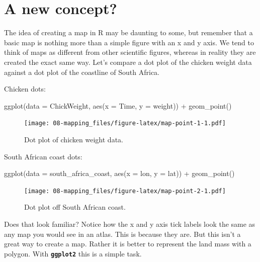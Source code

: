 \documentclass[
]{book}
\newenvironment{Shaded}{\begin{snugshade}}{\end{snugshade}}
\newcommand{\AttributeTok}[1]{\textcolor[rgb]{0.77,0.63,0.00}{#1}}
\newcommand{\FunctionTok}[1]{\textcolor[rgb]{0.00,0.00,0.00}{#1}}
\newcommand{\NormalTok}[1]{#1}
\newcommand{\SpecialCharTok}[1]{\textcolor[rgb]{0.00,0.00,0.00}{#1}}
\begin{document}
\hypertarget{a-new-concept}{%
\section{A new concept?}\label{a-new-concept}}

The idea of creating a map in R may be daunting to some, but remember that a basic map is nothing more than a simple figure with an x and y axis. We tend to think of maps as different from other scientific figures, whereas in reality they are created the exact same way. Let's compare a dot plot of the chicken weight data against a dot plot of the coastline of South Africa.

Chicken dots:

\begin{Shaded}
\begin{Highlighting}[]
\FunctionTok{ggplot}\NormalTok{(}\AttributeTok{data =}\NormalTok{ ChickWeight, }\FunctionTok{aes}\NormalTok{(}\AttributeTok{x =}\NormalTok{ Time, }\AttributeTok{y =}\NormalTok{ weight)) }\SpecialCharTok{+}
  \FunctionTok{geom\_point}\NormalTok{()}
\end{Highlighting}
\end{Shaded}

\begin{figure}
\centering
\texttt{[image: 08-mapping\_files/figure-latex/map-point-1-1.pdf]}
\caption{\label{fig:map-point-1}Dot plot of chicken weight data.}
\end{figure}

South African coast dots:

\begin{Shaded}
\begin{Highlighting}[]
\FunctionTok{ggplot}\NormalTok{(}\AttributeTok{data =}\NormalTok{ south\_africa\_coast, }\FunctionTok{aes}\NormalTok{(}\AttributeTok{x =}\NormalTok{ lon, }\AttributeTok{y =}\NormalTok{ lat)) }\SpecialCharTok{+}
  \FunctionTok{geom\_point}\NormalTok{()}
\end{Highlighting}
\end{Shaded}

\begin{figure}
\centering
\texttt{[image: 08-mapping\_files/figure-latex/map-point-2-1.pdf]}
\caption{\label{fig:map-point-2}Dot plot off South African coast.}
\end{figure}

Does that look familiar? Notice how the x and y axis tick labels look the same as any map you would see in an atlas. This is because they are. But this isn't a great way to create a map. Rather it is better to represent the land mass with a polygon. With \textbf{\texttt{ggplot2}} this is a simple task.
\end{document}
